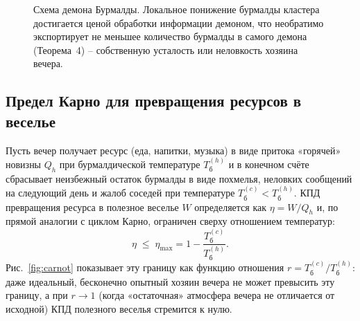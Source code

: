 \documentclass[11pt,a4paper]{article}
\newcommand{\Burm}{\text{Б}}
\newcommand{\Tb}{T_{\text{б}}}
\begin{document}
\begin{figure}[htbp]
\centering
{}
\caption{Схема демона Бурмалды. Локальное понижение бурмалды кластера достигается ценой обработки информации демоном, что необратимо экспортирует не меньшее количество бурмалды в самого демона (Теорема~4) -- собственную усталость или неловкость хозяина вечера.}
\label{fig:demon}
\end{figure}

\subsection{Предел Карно для превращения ресурсов в веселье}

Пусть вечер получает ресурс (еда, напитки, музыка) в виде притока «горячей» новизны $Q_h$ при бурмалдической температуре $\Tb^{(h)}$ и в конечном счёте сбрасывает неизбежный остаток бурмалды в виде похмелья, неловких сообщений на следующий день и жалоб соседей при температуре $\Tb^{(c)}<\Tb^{(h)}$. КПД превращения ресурса в полезное веселье $W$ определяется как $\eta=W/Q_h$ и, по прямой аналогии с циклом Карно, ограничен сверху отношением температур:
\[
\eta \;\leq\; \eta_{\max} = 1-\frac{\Tb^{(c)}}{\Tb^{(h)}}.
\]
Рис.~\ref{fig:carnot} показывает эту границу как функцию отношения $r=\Tb^{(c)}/\Tb^{(h)}$: даже идеальный, бесконечно опытный хозяин вечера не может превысить эту границу, а при $r\to1$ (когда «остаточная» атмосфера вечера не отличается от исходной) КПД полезного веселья стремится к нулю.
\end{document}
